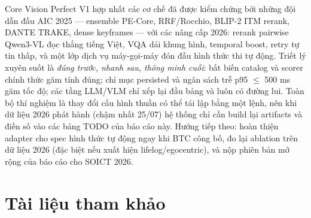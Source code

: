 \documentclass{ai_conquer2026}
\begin{document}
Core Vision Perfect V1 hợp nhất các cơ chế đã được kiểm chứng bởi những đội dẫn đầu AIC 2025
--- ensemble PE-Core, RRF/Rocchio, BLIP-2 ITM rerank, DANTE TRAKE, dense keyframes ---
với các nâng cấp 2026: rerank pairwise Qwen3-VL đọc thẳng tiếng Việt, VQA dải khung hình,
temporal boost, retry tự tin thấp, và một lớp dịch vụ máy-gọi-máy đón đầu hình thức thi tự
động. Triết lý xuyên suốt là \emph{đúng trước, nhanh sau, thông minh cuối}: bất biến catalog
và scorer chính thức găm tính đúng; chỉ mục persisted và ngân sách trễ p95 $\le$ 500 ms găm
tốc độ; các tầng LLM/VLM chỉ xếp lại đầu bảng và luôn có đường lui. Toàn bộ thí nghiệm là
thay đổi cấu hình thuần có thể tái lập bằng một lệnh, nên khi dữ liệu 2026 phát hành
(chậm nhất 25/07) hệ thống chỉ cần build lại artifacts và điền số vào các bảng TODO của báo
cáo này. Hướng tiếp theo: hoàn thiện adapter cho spec hình thức tự động ngay khi BTC công bố,
đo lại ablation trên dữ liệu 2026 (đặc biệt nếu xuất hiện lifelog/egocentric), và nộp phiên
bản mở rộng của báo cáo cho SOICT 2026. %

\newpage
\section*{Tài liệu tham khảo}
\printbibliography[heading=none]
\end{document}
